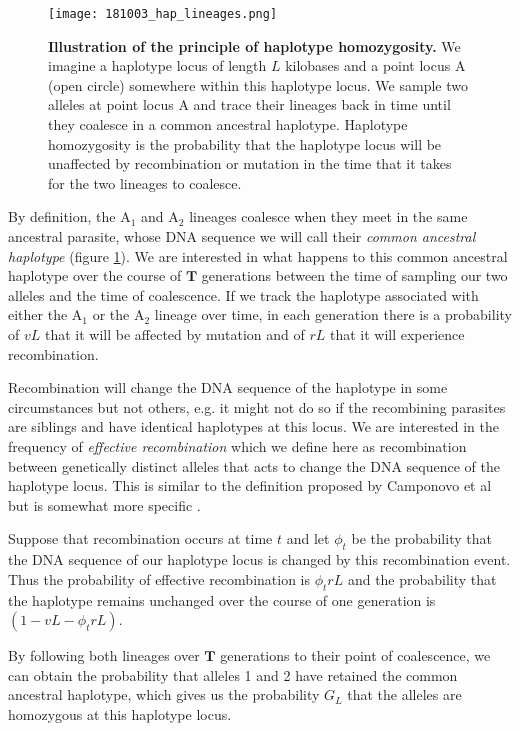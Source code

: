 \documentclass[_main.tex]{subfiles}
\begin{document}
\begin{figure}[h!]
\centering
\texttt{[image: 181003\_hap\_lineages.png]}
\caption{\textbf{Illustration of the principle of haplotype homozygosity.}  We imagine a haplotype locus of length $L$ kilobases and a point locus A (open circle) somewhere within this haplotype locus.  We sample two alleles at point locus A and trace their lineages back in time until they coalesce in a common ancestral haplotype.  Haplotype homozygosity is the probability that the haplotype locus will be unaffected by recombination or mutation in the time that it takes for the two lineages to coalesce.}
\label{fig:main_ancestral_haplotype}
\end{figure}

By definition, the $\text{A}_1$ and $\text{A}_2$ lineages coalesce when they meet in the same ancestral parasite, whose DNA sequence we will call their \textit{common ancestral haplotype} (figure \ref{fig:main_ancestral_haplotype}). We are interested in what happens to this common ancestral haplotype over the course of $\textbf{T}$ generations between the time of sampling our two alleles and the time of coalescence.  If we track the haplotype associated with either the $\text{A}_1$ or the $\text{A}_2$ lineage over time, in each generation there is a probability of $vL$ that it will be affected by mutation and of $rL$ that it will experience recombination.   

Recombination will change the DNA sequence of the haplotype in some circumstances but not others, e.g. it might not do so if the recombining parasites are siblings and have identical haplotypes at this locus.  We are interested in the frequency of \textit{effective recombination} which we define here as recombination between genetically distinct alleles that acts to change the DNA sequence of the haplotype locus.  This is similar to the definition proposed by Camponovo et al but is somewhat more specific \cite{Camponovo2023}. 

Suppose that recombination occurs at time $t$ and let $\phi_t$ be the probability that the DNA sequence of our haplotype locus is changed by this recombination event.  Thus the probability of effective recombination is $\phi_t r L$ and the probability that the haplotype remains unchanged over the course of one generation is $ ( 1 - v L - \phi_t r L )$. 

By following both lineages over $\textbf{T}$ generations to their point of coalescence, we can obtain the probability that alleles 1 and 2 have retained the common ancestral haplotype, which gives us the probability $G_L$ that the alleles are homozygous at this haplotype locus.
\end{document}
